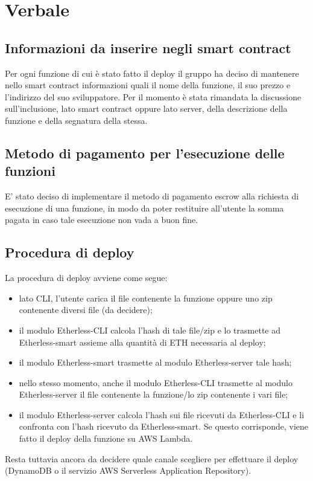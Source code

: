 \section{Verbale}

	\subsection{Informazioni da inserire negli smart contract}
	Per ogni funzione di cui è stato fatto il deploy il gruppo ha deciso di mantenere nello smart contract informazioni quali il nome della funzione, il suo prezzo e l'indirizzo del suo sviluppatore. Per il momento è stata rimandata la discussione sull'inclusione, lato smart contract oppure lato server, della descrizione della funzione e della segnatura della stessa.
	
	\subsection{Metodo di pagamento per l'esecuzione delle funzioni}
	E' stato deciso di implementare il metodo di pagamento escrow alla richiesta di esecuzione di una funzione, in modo da poter restituire all'utente la somma pagata in caso tale esecuzione non vada a buon fine.
	
	\subsection{Procedura di deploy}
	La procedura di deploy avviene come segue:
		\begin{itemize}
			\item lato CLI, l'utente carica il file contenente la funzione oppure uno zip contenente diversi file (da decidere);
			\item il modulo Etherless-CLI calcola l'hash di tale file/zip e lo trasmette ad Etherless-smart assieme alla quantità di ETH necessaria al deploy;
			\item il modulo Etherless-smart trasmette al modulo Etherless-server tale hash;
			\item nello stesso momento, anche il modulo Etherless-CLI trasmette al modulo Etherless-server il file contenente la funzione/lo zip contenente i vari file;
			\item il modulo Etherless-server calcola l'hash sui file ricevuti da Etherless-CLI e li confronta con l'hash ricevuto da Etherless-smart. Se questo corrisponde, viene fatto il deploy della funzione su AWS Lambda.	
		\end{itemize}
	Resta tuttavia ancora da decidere quale canale scegliere per effettuare il deploy (DynamoDB o il servizio AWS Serverless Application Repository).
	
